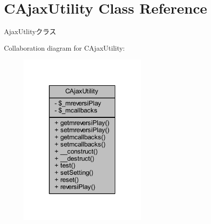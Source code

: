 \hypertarget{class_c_ajax_utility}{}\section{C\+Ajax\+Utility Class Reference}
\label{class_c_ajax_utility}


Ajax\+Utlityクラス  




Collaboration diagram for C\+Ajax\+Utility\+:
\nopagebreak
\begin{figure}[H]
\begin{center}
\leavevmode
\includegraphics[width=181pt]{class_c_ajax_utility__coll__graph}
\end{center}
\end{figure}
